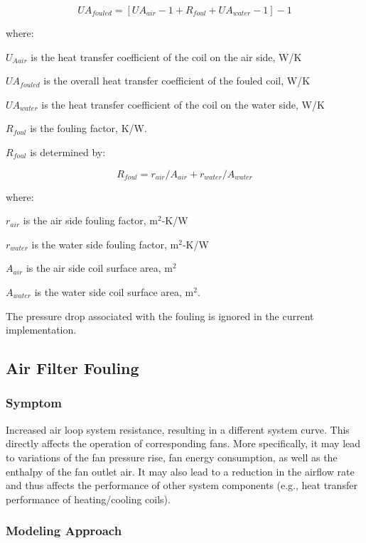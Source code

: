 \begin{equation}
UA_{fouled} = [UA_{air} - 1  +  R_{foul}  + UA_{water} - 1]-1
\end{equation}

where:

\(U_{Aair}\) is the heat transfer coefficient of the coil on the air side, W/K

\(UA_{fouled}\) is the overall heat transfer coefficient of the fouled coil, W/K

\(UA_{water}\) is the heat transfer coefficient of the coil on the water side, W/K

\(R_{foul}\) is the fouling factor, K/W.

\(R_{foul}\) is determined by:

\begin{equation}
R_{foul} = r_{air}/A_{air} + r_{water} / A_{water}
\end{equation}

where:

\(r_{air}\) is the air side fouling factor, m\(^{2}\)-K/W

\(r_{water}\) is the water side fouling factor, m\(^{2}\)-K/W

\(A_{air}\) is the air side coil surface area, m\(^{2}\)

\(A_{water}\) is the water side coil surface area, m\(^{2}\).

The pressure drop associated with the fouling is ignored in the current implementation.

\subsection{Air Filter Fouling}\label{air-filter-fouling}

\subsubsection{Symptom}\label{symptom-3}

Increased air loop system resistance, resulting in a different system curve. This directly affects the operation of corresponding fans. More specifically, it may lead to variations of the fan pressure rise, fan energy consumption, as well as the enthalpy of the fan outlet air. It may also lead to a reduction in the airflow rate and thus affects the performance of other system components (e.g., heat transfer performance of heating/cooling coils).

\subsubsection{Modeling Approach}\label{modeling-approach-3}

